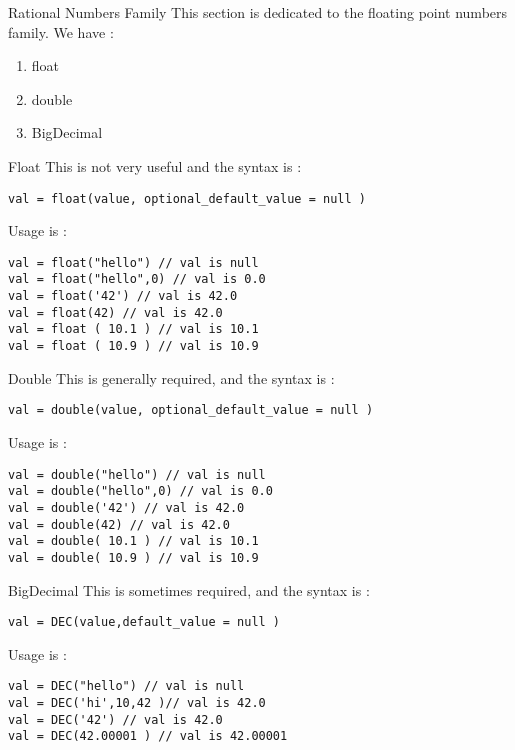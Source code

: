 \begin{section}{Rational Numbers Family}
This section is dedicated to the floating point numbers family.
We have :
\begin{enumerate}
\item{float}
\item{double}
\item{BigDecimal}
\end{enumerate}

\begin{subsection}{Float}
This is not very useful and the syntax is :

\begin{lstlisting}[style=JexlStyle]
val = float(value, optional_default_value = null )
\end{lstlisting}

Usage is :

\begin{lstlisting}[style=JexlStyle]
val = float("hello") // val is null
val = float("hello",0) // val is 0.0
val = float('42') // val is 42.0 
val = float(42) // val is 42.0 
val = float ( 10.1 ) // val is 10.1 
val = float ( 10.9 ) // val is 10.9 
\end{lstlisting}

\end{subsection}


\begin{subsection}{Double}
This is generally required, and the syntax is :

\begin{lstlisting}[style=JexlStyle]
val = double(value, optional_default_value = null )
\end{lstlisting}

Usage is :

\begin{lstlisting}[style=JexlStyle]
val = double("hello") // val is null
val = double("hello",0) // val is 0.0
val = double('42') // val is 42.0 
val = double(42) // val is 42.0 
val = double( 10.1 ) // val is 10.1 
val = double( 10.9 ) // val is 10.9 
\end{lstlisting}

\end{subsection}

\begin{subsection}{BigDecimal}
This is sometimes required, and the syntax is :

\begin{lstlisting}[style=JexlStyle]
val = DEC(value,default_value = null )
\end{lstlisting}

Usage is :

\begin{lstlisting}[style=JexlStyle]
val = DEC("hello") // val is null
val = DEC('hi',10,42 )// val is 42.0
val = DEC('42') // val is 42.0 
val = DEC(42.00001 ) // val is 42.00001
\end{lstlisting}

\end{subsection}

\end{section}

